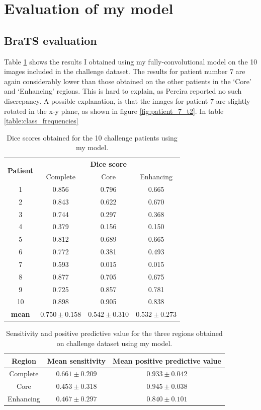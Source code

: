 \documentclass[12pt,a4paper,twoside,openright]{report}
\begin{document}
\section{Evaluation of my model}
\subsection{BraTS evaluation}
Table \ref{table:my_model_dice_results} shows the results I obtained using my fully-convolutional model on the 10 images included in the challenge dataset. The results for patient number 7 are again considerably lower than those obtained on the other patients in the `Core' and `Enhancing' regions. This is hard to explain, as Pereira reported no such discrepancy. A possible explanation, is that the images for patient 7 are slightly rotated in the x-y plane, as shown in figure \ref{fig:patient_7_t2}. In table \ref{table:class_frequencies}

\begin{table}
\centering	
\begin{tabular}{ c | c c c} 
\multirow{2}{*}{\textbf{Patient}} & \multicolumn{3}{c}{\textbf{Dice score}} \\
 & Complete & Core & Enhancing \\
 \hline
1 & 0.856 & 0.796 & 0.665 \\
2 & 0.843 & 0.622 & 0.670 \\
3 & 0.744 & 0.297 & 0.368 \\
4 & 0.379 & 0.156 & 0.150 \\
5 & 0.812 & 0.689 & 0.665 \\
6 & 0.772 & 0.381 & 0.493 \\
7 & 0.593 & 0.015 & 0.015 \\
8 & 0.877 & 0.705 & 0.675 \\
9 & 0.725 & 0.857 & 0.781 \\
10 & 0.898 & 0.905 & 0.838 \\
\textbf{mean} & $0.750 \pm 0.158$ & $0.542 \pm 0.310$ & $0.532 \pm 0.273$
\end{tabular}
\caption{Dice scores obtained for the 10 challenge patients using my model.}
\label{table:my_model_dice_results}
\end{table}

\begin{table}
\centering	
\begin{tabular}{ c | c | c} 
\textbf{Region} & \textbf{Mean sensitivity } & \textbf{Mean positive predictive value} \\
\hline
Complete &	$0.661 \pm 0.209$ & $0.933 \pm 0.042$ \\
Core & 		$0.453 \pm 0.318$ & $0.945 \pm 0.038$ \\
Enhancing & $0.467 \pm 0.297$ & $0.840 \pm 0.101$ \\
\end{tabular}
\caption{Sensitivity and positive predictive value for the three regions obtained on challenge dataset using my model.}
\label{table:my_model_sensitivity_ppv}
\end{table}
\end{document}
